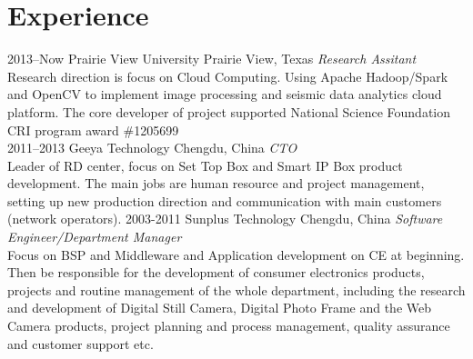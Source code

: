 \documentclass[]{friggeri-cv} %
\begin{document}

\section{Experience}

\begin{entrylist}
\entry
{2013--Now}
{Prairie View University}
{Prairie View, Texas}
{\emph{Research Assitant} \\
Research direction is focus on Cloud Computing. Using Apache Hadoop/Spark and OpenCV to implement image processing and seismic data analytics cloud platform. The core developer of project supported National Science Foundation CRI program award \#1205699 \\
}
\entry
{2011--2013}
{Geeya Technology}
{Chengdu, China}
{\emph{CTO} \\
Leader of RD center, focus on Set Top Box and Smart IP Box product development.
The main jobs are human resource and project management, setting up new production direction and communication with main customers (network operators).
}
\entry
{2003-2011}
{Sunplus Technology}
{Chengdu, China}
{\emph{Software Engineer/Department Manager} \\
Focus on BSP and Middleware and Application development on CE at beginning. Then be responsible for the development of consumer electronics products, projects and routine management of the whole department, including the research and development of Digital Still Camera, Digital Photo Frame and the Web Camera products, project planning and process management, quality assurance and customer support etc.
}
\end{entrylist}

\end{document}
